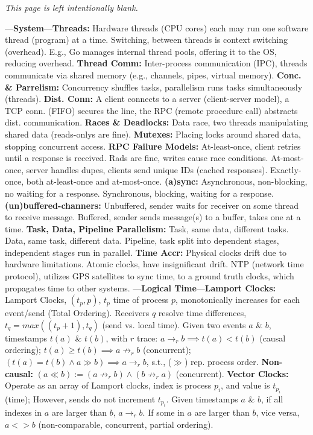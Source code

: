 


\thispagestyle{empty}
\mbox{}
\vfill
\begin{center}
    \textit{This page is left intentionally blank.}
\end{center}
\vfill
\newpage
\noindent


\begin{multicols}{2}

\noindent
---\textbf{System}---\textbf{Threads:} Hardware threads (CPU cores) each
may run one software thread (program) at a time. Switching,
between threads is context switching (overhead). E.g.,
Go manages internal thread pools, offering it to the OS,
reducing overhead.
\textbf{Thread Comm:} Inter-process communication (IPC), 
threads communicate via shared memory (e.g., channels, pipes, virtual memory).
\textbf{Conc. \& Parrelism:} Concurrency shuffles tasks,
parallelism runs tasks simultaneously (threads).
\textbf{Dist. Conn:} A client connects to a server (client-server model), a TCP conn. (FIFO)
secures the line, the RPC (remote procedure call) abstracts
dist. communication.
\textbf{Races \& Deadlocks:} Data race, two threads manipulating shared data (reads-onlys are fine).
\textbf{Mutexes:} Placing locks around shared data, stopping concurrent access.
\textbf{RPC Failure Models:} At-least-once, client retries until a response is received.
Rads are fine, writes cause race conditions. At-most-once, server handles dupes, clients
send unique IDs (cached responses). Exactly-once, both at-least-once and at-most-once.
\textbf{(a)sync:} Asynchronous, non-blocking, no waiting for a response. Synchronous, blocking, waiting for a response.
\textbf{(un)buffered-channers:} Unbuffered, sender waits for receiver on some thread to receive message. Buffered, sender sends message(s) to a buffer, takes one at a time.
\textbf{Task, Data, Pipeline Parallelism:} Task, same data, different tasks. Data, same task, different data. Pipeline, task split into dependent stages, independent stages run in parallel.
\textbf{Time Accr:} Physical clocks drift due to hardware limitations. Atomic clocks, have insignificant drift. NTP (network time protocol), 
utilizes GPS satellites to sync time, to a ground truth clocks, which propagates time to other systems.
---\textbf{Logical Time}---\textbf{Lamport Clocks:} 
Lamport Clocks, $(t_p, p)$, $t_p$ time of process $p$, monotonically increases for each event/send (Total Ordering). 
Receivers $q$ resolve time differences, $t_q = max((t_p+1), t_q)$ (send vs. local time). Given 
two events $a$ \& $b$, timestamps $t(a)$ \& $t(b)$, with $r$ trace: $a\to_r b \implies t(a) < t(b)$ (causal ordering);
$t(a) \geq t(b) \implies a \not\to_r b$ (concurrent); $(t(a) = t(b) \land a\gg b) \implies a \to_r b$, s.t., ($\gg$) rep. process order.
\textbf{Non-causal:} $(a\ll b):= (a \not\to_r b) \land (b\not\to_r a)$ (concurrent).
\textbf{Vector Clocks:} Operate as an array of Lamport clocks, index is process $p_i$, and value is $t_{p_i}$ (time); However, sends do not increment $t_{p_i}$.
Given timestamps $a$ \& $b$, if all indexes in $a$ are larger than $b$, $a\to_r b$. If some in $a$ are larger than $b$, vice versa, $a<>b$ (non-comparable, concurrent, partial ordering).


\end{multicols}
